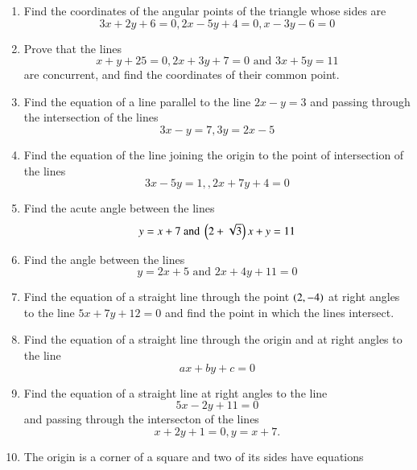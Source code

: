 \begin{enumerate}[1.]
\item Find the coordinates of the angular points of the triangle whose sides are
\begin{equation*}
3x+2y+6 = 0, 2x-5y+4 = 0, x -3y -6 = 0
\end{equation*}
\item Prove that the lines
\begin{equation*}
x+y+25 = 0, 2x+3y+7 = 0 \text{ and } 3x+5y = 11
\end{equation*}
%
are concurrent, and find the coordinates of their common point.
\item Find the equation of a line parallel to the line $2x-y=3$ and passing through the intersection of the lines
\begin{equation*}
3x-y=7, 3y = 2x -5
\end{equation*}
\item Find the equation of the line joining the origin to the point of intersection of the lines
\begin{equation*}
3x-5y = 1,, 2x+7y+4 = 0
\end{equation*}
%
\item Find the acute angle between the lines
\begin{equation*}
y = x + 7 \text{ and } \left(2+\sqrt{3}\right)x + y = 11
\end{equation*}
\item Find the angle between the lines
\begin{equation}
y = 2x+5 \text{ and } 2x + 4y + 11 = 0
\end{equation}
\item Find the equation of a straight line through the point $\left(2,-4\right)$ at right angles to the line $5x+7y+12=0$ and find the point in
which the lines intersect.
\item Find the equation of a straight line through the origin and at right angles to the line
\begin{equation*}
ax+by+c = 0
\end{equation*}
\item Find the equation of a straight line at right angles to the line
\begin{equation*}
5x-2y+11 = 0
\end{equation*}
and passing through the intersecton of the lines
\begin{equation*}
x + 2y+1 = 0, y = x+7. 
\end{equation*}
\item The origin is a corner of a square and two of its sides have equations

\end{enumerate}
